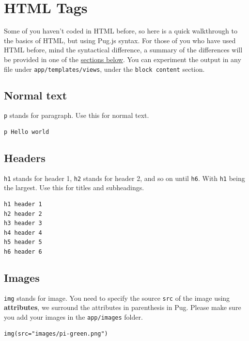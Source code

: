 \section{HTML Tags}

Some of you haven't coded in HTML before, so here is a quick walkthrough to the basics of HTML, but using Pug.js syntax. For those of you who have used HTML before, mind the syntactical difference, a summary of the differences will be provided in one of the \hyperref[sec:pugvshtml]{sections below}. You can experiment the output in any file under \texttt{app/templates/views}, under the \texttt{block content} section.

\subsection{Normal text}

\texttt{p} stands for paragraph. Use this for normal text.
\vspace{6mm}

\begin{lstlisting}[language=pug]
p Hello world
\end{lstlisting}

\subsection{Headers}

\texttt{h1} stands for header 1, \texttt{h2} stands for header 2, and so on until \texttt{h6}. With \texttt{h1} being the largest. Use this for titles and subheadings.
\vspace{6mm}

\begin{lstlisting}[language=pug]
h1 header 1
h2 header 2
h3 header 3
h4 header 4
h5 header 5
h6 header 6
\end{lstlisting}

\subsection{Images}

\texttt{img} stands for image. You need to specify the source \texttt{src} of the image using \textbf{attributes}, we surround the attributes in parenthesis in Pug. Please make sure you add your images in the \texttt{app/images} folder.
\vspace{6mm}

\begin{lstlisting}[language=pug]
img(src="images/pi-green.png")
\end{lstlisting}

